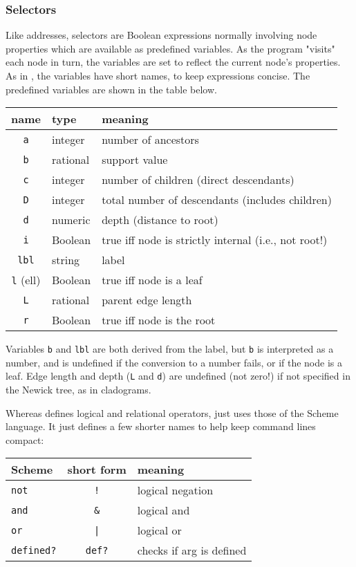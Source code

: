 \subsubsection{Selectors}

Like \ed{} addresses, \sched{} selectors are Boolean expressions normally
involving node properties which are available as predefined variables. As the
program "visits" each node in turn, the variables are set to reflect the current
node's properties. As in \ed{}, the variables have short names, to keep
expressions concise. The predefined variables are shown in the table below.

\begin{center}
\begin{tabular}{cll}
name & type & meaning \\
\hline
\texttt{a} & integer & number of ancestors  \\
\texttt{b} & rational & support value \\
\texttt{c} & integer & number of children (direct descendants) \\
\texttt{D} & integer & total number of descendants (includes children) \\
\texttt{d} & numeric & depth (distance to root) \\
\texttt{i} & Boolean & true iff node is strictly internal (i.e., not root!) \\
\texttt{lbl} & string & label \\
\texttt{l} (ell) & Boolean & true iff node is a leaf \\
\texttt{L} & rational & parent edge length \\
\texttt{r} & Boolean & true iff node is the root
\end{tabular}
\end{center}

\noindent{}Variables \texttt{b} and \texttt{lbl} are both derived from the
label, but \texttt{b} is interpreted as a number, and is undefined if the
conversion to a number fails, or if the node is a leaf. Edge length and depth
(\texttt{L} and \texttt{d}) are undefined (not zero!) if not specified in the
Newick tree, as in cladograms.

Whereas \ed{} defines logical and relational operators, \sched{} just uses those
of the Scheme language. It just defines a few shorter names to help keep command
lines compact:

\begin{center}
\begin{tabular}{lcl}
Scheme & \sched{} short form & meaning \\
\hline
\texttt{not} 	& \texttt{!} 				& logical negation \\
\texttt{and} 	& \texttt{\&} 			& logical and \\
\texttt{or}  	& \texttt{|} 				& logical or \\
\texttt{defined?}	& \texttt{def?}	& checks if arg is defined
\end{tabular}
\end{center}

